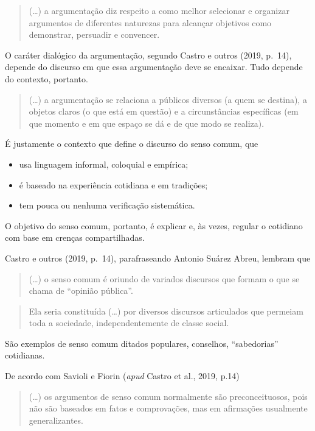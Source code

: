\documentclass[
]{book}
\begin{document}
\begin{quote}
(\ldots) a argumentação diz respeito a como melhor selecionar e organizar argumentos de diferentes naturezas para alcançar objetivos como demonstrar, persuadir e convencer.
\end{quote}

O caráter dialógico da argumentação, segundo Castro e outros (2019, p.~14), depende do discurso em que essa argumentação deve se encaixar. Tudo depende do contexto, portanto.

\begin{quote}
(\ldots) a argumentação se relaciona a públicos diversos (a quem se destina), a objetos claros (o que está em questão) e a circunstâncias específicas (em que momento e em que espaço se dá e de que modo se realiza).
\end{quote}

É justamente o contexto que define o discurso do senso comum, que

\begin{itemize}
\item
  usa linguagem informal, coloquial e empírica;
\item
  é baseado na experiência cotidiana e em tradições;
\item
  tem pouca ou nenhuma verificação sistemática.
\end{itemize}

O objetivo do senso comum, portanto, é explicar e, às vezes, regular o cotidiano com base em crenças compartilhadas.

Castro e outros (2019, p.~14), parafraseando Antonio Suárez Abreu, lembram que

\begin{quote}
(\ldots) o senso comum é oriundo de variados discursos que formam o que se chama de ``opinião pública''.
\end{quote}

\begin{quote}
Ela seria constituída (\ldots) por diversos discursos articulados que permeiam toda a sociedade, independentemente de classe social.
\end{quote}

São exemplos de senso comum ditados populares, conselhos, ``sabedorias'' cotidianas.

De acordo com Savioli e Fiorin (\emph{apud} Castro et al., 2019, p.14)

\begin{quote}
(\ldots) os argumentos de senso comum normalmente são preconceituosos, pois não são baseados em fatos e comprovações, mas em afirmações usualmente generalizantes.
\end{quote}
\end{document}
